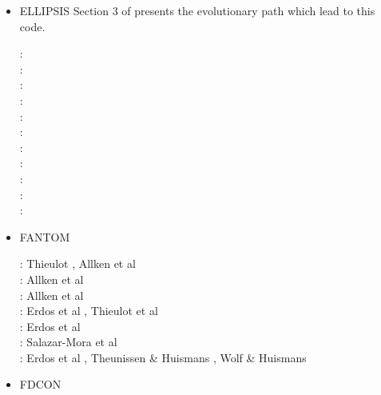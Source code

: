 \begin{itemize}
\item {\codefont ELLIPSIS} 
Section 3 of \cite{qums07} presents the evolutionary path which lead to this code.

{\small
\noindent
\twothousandthree: \cite{modm03}\cite{wibm03}\cite{mumc03}\cite{wemv03}\cite{onmo03}\cite{onml03}\\
\twothousandfour: \cite{wijns2004}\\
\twothousandfive: \cite{wiwg05}\cite{onml05}\cite{onmj05}\\
\twothousandsix: \cite{onmm06} \\
\twothousandseven: \cite{moql07}\cite{gewm07}\cite{dyrm07}\cite{onlm07}\\
\twothousandeight: \cite{onlg08}\\
\twothousandnine: \cite{onlj09}\\
\twothousandten: \cite{pyeg10}\\
\twothousandeleven: \cite{legu11}\\
\twothousandtwelve: \cite{lega12}\\
\twothousandfourteen: \cite{recf14}
}

\item FANTOM 

\begin{scriptsize}
\noindent
\twothousandeleven:
Thieulot \cite{thie11}, Allken et al \cite{alht11}\\
\twothousandtwelve:
Allken et al \cite{alht12}\\
\twothousandthirteen:
Allken et al \cite{alhf13}\\
\twothousandfourteen:
Erdos et al \cite{erhv14}, Thieulot et al \cite{thsh14}\\
\twothousandfifteen:
Erdos et al \cite{erhv15}\\
\twothousandeighteen:
Salazar-Mora et al \cite{sahf18}\\
\twothousandnineteen:
Erdos et al \cite{erhv19}, Theunissen \& Huismans \cite{thhu19}, Wolf \& Huismans \cite{wohu19}\\
\end{scriptsize}

\item FDCON 


\end{itemize}
